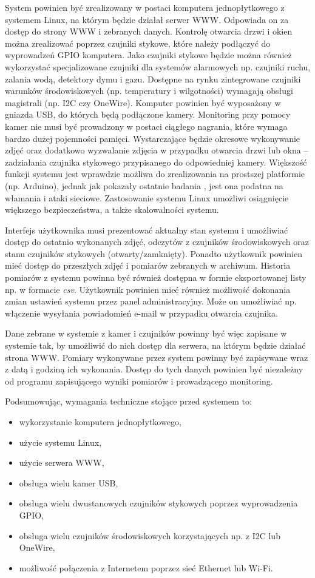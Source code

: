 \documentclass[a4paper,11pt,twoside]{article}
\begin{document}
System powinien być zrealizowany w postaci komputera jednopłytkowego z systemem Linux, na którym będzie działał serwer WWW. Odpowiada on za dostęp do strony WWW i zebranych danych. Kontrolę otwarcia drzwi i okien można zrealizować poprzez czujniki stykowe, które należy podłączyć do wyprowadzeń GPIO komputera. Jako czujniki stykowe będzie można również wykorzystać specjalizowane czujniki dla systemów alarmowych np. czujniki ruchu, zalania wodą, detektory dymu i gazu. Dostępne na rynku zintegrowane czujniki warunków środowiskowych (np. temperatury i wilgotności) wymagają obsługi magistrali (np. I2C czy OneWire). Komputer powinien być wyposażony w gniazda USB, do których będą podłączone kamery. Monitoring przy pomocy kamer nie musi być prowadzony w postaci ciągłego nagrania, które wymaga bardzo dużej pojemności pamięci. Wystarczające będzie okresowe wykonywanie zdjęć oraz dodatkowo wyzwalanie zdjęcia w przypadku otwarcia drzwi lub okna -- zadziałania czujnika stykowego przypisanego do odpowiedniej kamery. Większość funkcji systemu jest wprawdzie możliwa do zrealizowania na prostszej platformie (np. Arduino), jednak jak pokazały ostatnie badania \cite{arduino-wlamania}, jest ona podatna na włamania i ataki sieciowe. Zastosowanie systemu Linux umożliwi osiągnięcie większego bezpieczeństwa, a także skalowalności systemu. 

Interfejs użytkownika musi prezentować aktualny stan systemu i umożliwiać dostęp do ostatnio wykonanych zdjęć, odczytów z czujników środowiskowych oraz stanu czujników stykowych (otwarty/zamknięty). Ponadto użytkownik powinien mieć dostęp do przeszłych zdjęć i pomiarów zebranych w archiwum. Historia pomiarów z systemu powinna być również dostępna w formie eksportowanej listy np. w formacie \textit{csv}. Użytkownik powinien mieć również możliwość dokonania zmian ustawień systemu przez panel administracyjny. Może on umożliwiać np. włączenie wysyłania powiadomień e-mail w przypadku otwarcia czujnika.

Dane zebrane w systemie z kamer i czujników powinny być więc zapisane w systemie tak, by umożliwić do nich dostęp dla serwera, na którym będzie działać strona WWW. Pomiary wykonywane przez system powinny być zapisywane wraz z datą i godziną ich wykonania. Dostęp do tych danych powinien być niezależny od programu zapisującego wyniki pomiarów i prowadzącego monitoring.

Podsumowując, wymagania techniczne stojące przed systemem to:
\begin{itemize}
\item wykorzystanie komputera jednopłytkowego,
\item użycie systemu Linux,
\item użycie serwera WWW,
\item obsługa wielu kamer USB,
\item obsługa wielu dwustanowych czujników stykowych poprzez wyprowadzenia GPIO,
\item obsługa wielu czujników środowiskowych korzystających np. z I2C lub OneWire,
\item możliwość połączenia z Internetem poprzez sieć Ethernet lub Wi-Fi.
\end{itemize}
\end{document}
